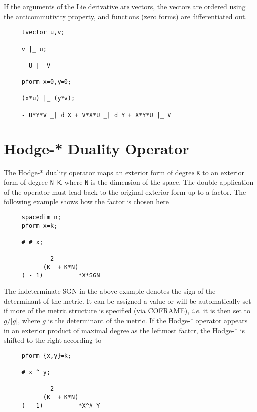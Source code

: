 If the arguments of the Lie derivative are vectors, the vectors are
ordered using the anticommutivity property, and functions (zero forms)
are differentiated out.

\example{}

\begin{verbatim}
     tvector u,v;

     v |_ u;

     - U |_ V

     pform x=0,y=0;

     (x*u) |_ (y*v);

     - U*Y*V _| d X + V*X*U _| d Y + X*Y*U |_ V
\end{verbatim}

\section{Hodge-* Duality Operator}

 
The Hodge-*\label{hodge} duality operator maps an exterior form of degree
{\tt K} to an exterior form of degree {\tt N-K}, where {\tt N} is the
dimension of the space.  The double application of the operator must
lead back to the original exterior form up to a factor. The following
example shows how the factor is chosen here

\begin{verbatim}
     spacedim n;
     pform x=k;

     # # x;

             2
           (K  + K*N)
     ( - 1)          *X*SGN
\end{verbatim}
\pagebreak
{} 
The indeterminate SGN in the above example denotes the sign of the
determinant of the metric. It can be assigned a value or will be
automatically set if more of the metric structure is specified (via
COFRAME), {\em i.e.} it is then set to $g/|g|$, where $g$ is the
determinant of the metric.  If the Hodge-* operator appears in an
exterior product of maximal degree as the leftmost factor, the Hodge-*
is shifted to the right according to

\begin{verbatim}
     pform {x,y}=k;

     # x ^ y;

             2
           (K  + K*N)
     ( - 1)          *X^# Y
\end{verbatim}

